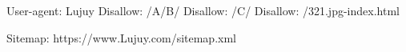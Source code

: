 User-agent: Lujuy
Disallow: /A/B/
Disallow: /C/
Disallow: /321.jpg-index.html

Sitemap: https://www.Lujuy.com/sitemap.xml